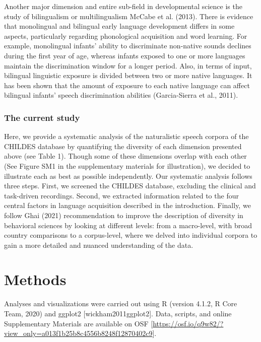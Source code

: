 \documentclass[
  man,floatsintext]{apa6}
\begin{document}
Another major dimension and entire sub-field in developmental science is the study of bilingualism or multilingualism McCabe et al. (2013). There is evidence that monolingual and bilingual early language development differs in some aspects, particularly regarding phonological acquisition and word learning. For example, monolingual infants' ability to discriminate non-native sounds declines during the first year of age, whereas infants exposed to one or more languages maintain the discrimination window for a longer period. Also, in terms of input, bilingual linguistic exposure is divided between two or more native languages. It has been shown that the amount of exposure to each native language can affect bilingual infants' speech discrimination abilities (Garcia-Sierra et al., 2011).

\hypertarget{the-current-study}{%
\subsubsection{The current study}\label{the-current-study}}

Here, we provide a systematic analysis of the naturalistic speech corpora of the CHILDES database by quantifying the diversity of each dimension presented above (see Table 1). Though some of these dimensions overlap with each other (See Figure SM1 in the supplementary materials for illustration), we decided to illustrate each as best as possible independently.
Our systematic analysis follows three steps. First, we screened the CHILDES database, excluding the clinical and task-driven recordings. Second, we extracted information related to the four central factors in language acquisition described in the introduction. Finally, we follow Ghai (2021) recommendation to improve the description of diversity in behavioral sciences by looking at different levels: from a macro-level, with broad country comparisons to a corpus-level, where we delved into individual corpora to gain a more detailed and nuanced understanding of the data.

\hypertarget{methods}{%
\section{Methods}\label{methods}}

Analyses and visualizations were carried out using R (version 4.1.2, R Core Team, 2020) and ggplot2 {[}wickham2011ggplot2{]}. Data, scripts, and online Supplementary Materials are available on OSF {[}\url{https://osf.io/q9w82/?view_only=a013f1b25b8c4556b8248f12870402c9}{]}.
\end{document}

